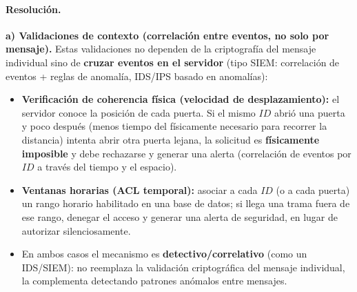 \paragraph{Resolución.}

\textbf{a) Validaciones de contexto (correlación entre eventos, no solo por mensaje).}
Estas validaciones no dependen de la criptografía del mensaje individual sino de
\textbf{cruzar eventos en el servidor} (tipo SIEM: correlación de eventos + reglas
de anomalía, IDS/IPS basado en anomalías):
\begin{itemize}
  \item \textbf{Verificación de coherencia física (velocidad de desplazamiento):} el
  servidor conoce la posición de cada puerta. Si el mismo $ID$ abrió una puerta y
  poco después (menos tiempo del físicamente necesario para recorrer la distancia)
  intenta abrir otra puerta lejana, la solicitud es \textbf{físicamente imposible}
  y debe rechazarse y generar una alerta (correlación de eventos por $ID$ a través
  del tiempo y el espacio).
  \item \textbf{Ventanas horarias (ACL temporal):} asociar a cada $ID$ (o a cada
  puerta) un rango horario habilitado en una base de datos; si llega una trama fuera
  de ese rango, denegar el acceso y generar una alerta de seguridad, en lugar de
  autorizar silenciosamente.
  \item En ambos casos el mecanismo es \textbf{detectivo/correlativo} (como un
  IDS/SIEM): no reemplaza la validación criptográfica del mensaje individual, la
  complementa detectando patrones anómalos entre mensajes.
\end{itemize}


